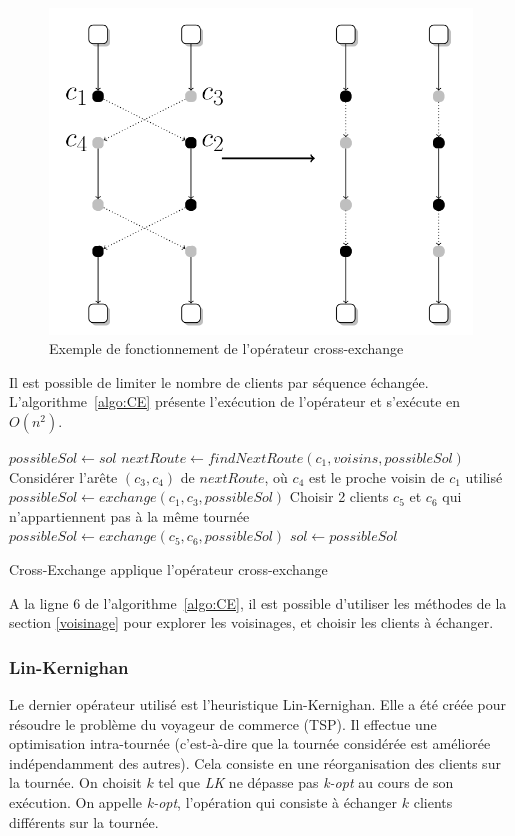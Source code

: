 \documentclass[a4paper,11pt]{article}%
\begin{document}
\begin{figure}
\centering
\includegraphics[scale=0.2]{cross_exchange_big.png}
\caption{Exemple de fonctionnement de l'opérateur cross-exchange}
\label{CE}
\end{figure}

Il est possible de limiter le nombre de clients par séquence échangée.
L'algorithme~\ref{algo:CE} présente l'exécution de l'opérateur et s'exécute en $O(n^2)$.

\begin{algorithm}
\DontPrintSemicolon 
{}
$possibleSol \gets sol$\;
$nextRoute \gets findNextRoute(c_1,voisins,possibleSol)$\;
Considérer l'arête $(c_3,c_4)$ de $nextRoute$, où $c_4$ est le proche voisin de $c_1$ utilisé\;
$possibleSol \gets exchange(c_1,c_3,possibleSol)$\;
Choisir 2 clients $c_5$ et $c_6$ qui n'appartiennent pas à la même tournée\;
$possibleSol \gets exchange(c_5,c_6,possibleSol)$\;
 {
	$sol \gets possibleSol$\;
}
\;
\caption{{\sc Cross-Exchange} applique l'opérateur cross-exchange}
\label{algo:CE}
\end{algorithm}

A la ligne $6$ de l'algorithme~\ref{algo:CE}, il est possible d'utiliser les méthodes de la section \ref{voisinage} pour explorer les voisinages, et choisir les clients à échanger.

\subsubsection{Lin-Kernighan}
\label{Lin-Kernighan}
Le dernier opérateur utilisé est l'heuristique Lin-Kernighan. Elle a été créée pour résoudre le problème du voyageur de commerce (TSP). 
Il effectue une optimisation intra-tournée (c'est-à-dire que la tournée considérée est améliorée indépendamment des autres).
Cela consiste en une réorganisation des clients sur la tournée. On choisit $k$ tel que \emph{LK} ne dépasse pas \emph{k-opt} au cours de son exécution. 
On appelle \emph{k-opt}, l'opération qui consiste à échanger $k$ clients différents sur la tournée.
\end{document}
